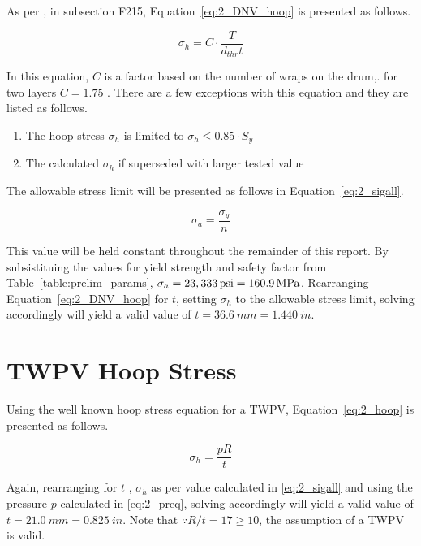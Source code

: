 As per \cite{DNVOSD101}, in subsection F215, Equation~\ref{eq:2_DNV_hoop} is presented as follows.

\begin{equation}
	\label{eq:2_DNV_hoop}
	\sigma_h = C\cdot\frac{T}{d_{thr}t}
\end{equation}

In this equation, $C$ is a factor based on the number of wraps on the drum,. for two layers $C=1.75$ \cite{DNVOSD101}. There are a few exceptions with this equation and they are listed as follows.

\begin{enumerate}
	\item The hoop stress $\sigma_h$ is limited to $\sigma_h \leq 0.85\cdot S_y$
	\item The calculated $\sigma_h$  if superseded with larger tested value\\
\end{enumerate}

The allowable stress limit will be presented as follows in Equation~\ref{eq:2_sigall}.

\begin{equation}
	\label{eq:2_sigall}
	\sigma_a = \frac{\sigma_y}{n}
\end{equation}

This value will be held constant throughout the remainder of this report. By subsistituing the values for yield strength and safety factor from Table~\ref{table:prelim_params}, $\sigma_a= 23,333 \,\mathrm{psi}= 160.9 \,\mathrm{MPa}$. Rearranging Equation~\ref{eq:2_DNV_hoop} for $t$, setting $\sigma_h$ to the allowable stress limit,  solving accordingly will yield a valid value of $t = 36.6\ mm = 1.440 \ in$. 

\section{TWPV Hoop Stress}

Using the well known hoop stress equation \cite{roarks} for a TWPV, Equation~\ref{eq:2_hoop} is presented as follows.

\begin{equation}
	\label{eq:2_hoop}
	\sigma_h = \frac{pR}{t}
\end{equation}

Again, rearranging for $t$ , $\sigma_h$ as per value calculated in \ref{eq:2_sigall} and using the pressure $p$ calculated in \ref{eq:2_preq}, solving accordingly will yield a valid value of $t = 21.0\ mm = 0.825 \ in$. Note that $\because R/t = 17 \geq 10$, the assumption of a TWPV is valid.

